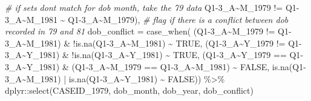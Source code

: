 \documentclass{article}
\newenvironment{Shaded}{\begin{snugshade}}{\end{snugshade}}
\newcommand{\AttributeTok}[1]{\textcolor[rgb]{0.77,0.63,0.00}{#1}}
\newcommand{\CommentTok}[1]{\textcolor[rgb]{0.56,0.35,0.01}{\textit{#1}}}
\newcommand{\ConstantTok}[1]{\textcolor[rgb]{0.00,0.00,0.00}{#1}}
\newcommand{\FunctionTok}[1]{\textcolor[rgb]{0.00,0.00,0.00}{#1}}
\newcommand{\NormalTok}[1]{#1}
\newcommand{\SpecialCharTok}[1]{\textcolor[rgb]{0.00,0.00,0.00}{#1}}
\newcommand{\StringTok}[1]{\textcolor[rgb]{0.31,0.60,0.02}{#1}}
\begin{document}
\begin{Shaded}
\begin{Highlighting}[]
      \CommentTok{\# if sets don\textquotesingle{}t match for dob month, take the 79 data}
      \StringTok{\textasciigrave{}}\AttributeTok{Q1{-}3\_A\textasciitilde{}M\_1979}\StringTok{\textasciigrave{}} \SpecialCharTok{!=} \StringTok{\textasciigrave{}}\AttributeTok{Q1{-}3\_A\textasciitilde{}M\_1981}\StringTok{\textasciigrave{}} \SpecialCharTok{\textasciitilde{}} \StringTok{\textasciigrave{}}\AttributeTok{Q1{-}3\_A\textasciitilde{}M\_1979}\StringTok{\textasciigrave{}}\NormalTok{),}
    \CommentTok{\# flag if there is a conflict between dob recorded in 79 and 81}
    \AttributeTok{dob\_conflict =} \FunctionTok{case\_when}\NormalTok{(}
\NormalTok{      (}\StringTok{\textasciigrave{}}\AttributeTok{Q1{-}3\_A\textasciitilde{}M\_1979}\StringTok{\textasciigrave{}} \SpecialCharTok{!=} \StringTok{\textasciigrave{}}\AttributeTok{Q1{-}3\_A\textasciitilde{}M\_1981}\StringTok{\textasciigrave{}}\NormalTok{) }\SpecialCharTok{\&} \SpecialCharTok{!}\FunctionTok{is.na}\NormalTok{(}\StringTok{\textasciigrave{}}\AttributeTok{Q1{-}3\_A\textasciitilde{}M\_1981}\StringTok{\textasciigrave{}}\NormalTok{)}
      \SpecialCharTok{\textasciitilde{}} \ConstantTok{TRUE}\NormalTok{,}
\NormalTok{      (}\StringTok{\textasciigrave{}}\AttributeTok{Q1{-}3\_A\textasciitilde{}Y\_1979}\StringTok{\textasciigrave{}} \SpecialCharTok{!=} \StringTok{\textasciigrave{}}\AttributeTok{Q1{-}3\_A\textasciitilde{}Y\_1981}\StringTok{\textasciigrave{}}\NormalTok{) }\SpecialCharTok{\&} \SpecialCharTok{!}\FunctionTok{is.na}\NormalTok{(}\StringTok{\textasciigrave{}}\AttributeTok{Q1{-}3\_A\textasciitilde{}Y\_1981}\StringTok{\textasciigrave{}}\NormalTok{)}
      \SpecialCharTok{\textasciitilde{}} \ConstantTok{TRUE}\NormalTok{,}
\NormalTok{      (}\StringTok{\textasciigrave{}}\AttributeTok{Q1{-}3\_A\textasciitilde{}Y\_1979}\StringTok{\textasciigrave{}} \SpecialCharTok{==} \StringTok{\textasciigrave{}}\AttributeTok{Q1{-}3\_A\textasciitilde{}Y\_1981}\StringTok{\textasciigrave{}}\NormalTok{) }\SpecialCharTok{\&}
\NormalTok{        (}\StringTok{\textasciigrave{}}\AttributeTok{Q1{-}3\_A\textasciitilde{}M\_1979}\StringTok{\textasciigrave{}} \SpecialCharTok{==} \StringTok{\textasciigrave{}}\AttributeTok{Q1{-}3\_A\textasciitilde{}M\_1981}\StringTok{\textasciigrave{}}\NormalTok{) }\SpecialCharTok{\textasciitilde{}} \ConstantTok{FALSE}\NormalTok{,}
      \FunctionTok{is.na}\NormalTok{(}\StringTok{\textasciigrave{}}\AttributeTok{Q1{-}3\_A\textasciitilde{}M\_1981}\StringTok{\textasciigrave{}}\NormalTok{) }\SpecialCharTok{|} \FunctionTok{is.na}\NormalTok{(}\StringTok{\textasciigrave{}}\AttributeTok{Q1{-}3\_A\textasciitilde{}Y\_1981}\StringTok{\textasciigrave{}}\NormalTok{) }\SpecialCharTok{\textasciitilde{}} \ConstantTok{FALSE}\NormalTok{)) }\SpecialCharTok{\%\textgreater{}\%}
\NormalTok{  dplyr}\SpecialCharTok{::}\FunctionTok{select}\NormalTok{(CASEID\_1979,}
\NormalTok{                dob\_month,}
\NormalTok{                dob\_year,}
\NormalTok{                dob\_conflict)}
\end{Highlighting}
\end{Shaded}
\end{document}
